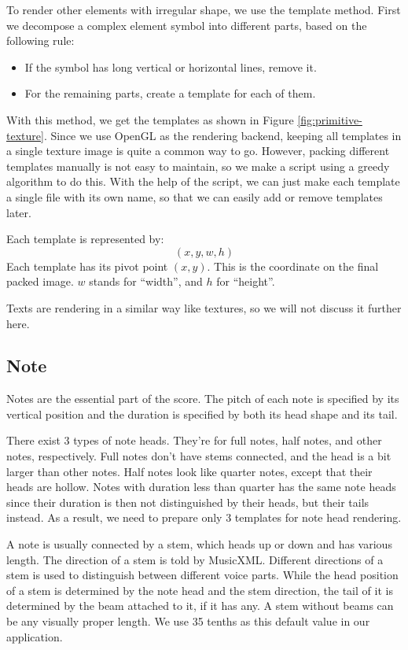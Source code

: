 To render other elements with irregular shape, we use the template method. First we decompose a complex element symbol into different parts, based on the following rule:
\begin{itemize}
    \item If the symbol has long vertical or horizontal lines, remove it.
    \item For the remaining parts, create a template for each of them.
\end{itemize}
With this method, we get the templates as shown in Figure \ref{fig:primitive-texture}. Since we use OpenGL as the rendering backend, keeping all templates in a single texture image is quite a common way to go. However, packing different templates manually is not easy to maintain, so we make a script using a greedy algorithm to do this. With the help of the script, we can just make each template a single file with its own name, so that we can easily add or remove templates later.

Each template is represented by:
\[
    (x, y, w, h)
\]
Each template has its pivot point $(x, y)$. This is the coordinate on the final packed image. $w$ stands for ``width'', and $h$ for ``height''. 

Texts are rendering in a similar way like textures, so we will not discuss it further here.

\subsection{Note}
Notes are the essential part of the score. The pitch of each note is specified by its vertical position and the duration is specified by both its head shape and its tail.

There exist 3 types of note heads. They're for full notes, half notes, and other notes, respectively. Full notes don't have stems connected, and the head is a bit larger than other notes. Half notes look like quarter notes, except that their heads are hollow. Notes with duration less than quarter has the same note heads since their duration is then not distinguished by their heads, but their tails instead. As a result, we need to prepare only 3 templates for note head rendering.
 
A note is usually connected by a stem, which heads up or down and has various length. The direction of a stem is told by MusicXML. Different directions of a stem is used to distinguish between different voice parts. While the head position of a stem is determined by the note head and the stem direction, the tail of it is determined by the beam attached to it, if it has any. A stem without beams can be any visually proper length. We use 35 tenths as this default value in our application. 

